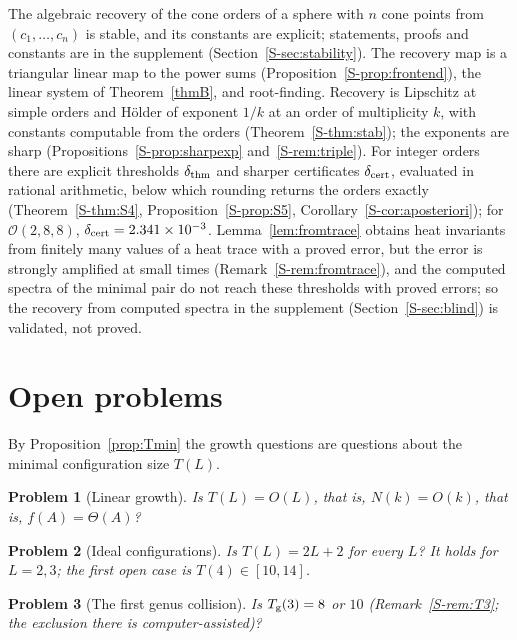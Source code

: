\documentclass[pdflatex,sn-mathphys-num]{sn-jnl}
\theoremstyle{thmstyleone}%
\theoremstyle{thmstylethree}%
\newtheorem{problem}{Problem}%
\newcommand{\Orb}{\mathcal{O}}
\newcommand{\sref}[1]{\ref*{S-#1}}%
\begin{document}
The algebraic recovery of the cone orders of a sphere with $n$ cone points from $(c_1,\dots,c_n)$ is stable, and its constants are explicit; statements, proofs and constants are in the supplement (Section~\sref{sec:stability}). The recovery map is a triangular linear map to the power sums (Proposition~\sref{prop:frontend}), the linear system of Theorem~\ref{thmB}, and root-finding. Recovery is Lipschitz at simple orders and H\"older of exponent $1/k$ at an order of multiplicity $k$, with constants computable from the orders (Theorem~\sref{thm:stab}); the exponents are sharp (Propositions~\sref{prop:sharpexp} and~\sref{rem:triple}). For integer orders there are explicit thresholds $\delta_{\rm thm}$ and sharper certificates $\delta_{\rm cert}$, evaluated in rational arithmetic, below which rounding returns the orders exactly (Theorem~\sref{thm:S4}, Proposition~\sref{prop:S5}, Corollary~\sref{cor:aposteriori}); for $\Orb(2,8,8)$, $\delta_{\rm cert}=2.341\times10^{-3}$. Lemma~\ref{lem:fromtrace} obtains heat invariants from finitely many values of a heat trace with a proved error, but the error is strongly amplified at small times (Remark~\sref{rem:fromtrace}), and the computed spectra of the minimal pair do not reach these thresholds with proved errors; so the recovery from computed spectra in the supplement (Section~\sref{sec:blind}) is validated, not proved.


\section{Open problems}\label{sec:open}

By Proposition~\ref{prop:Tmin} the growth questions are questions about the minimal configuration size $T(L)$.

\begin{problem}[Linear growth]\label{prob:growth}
Is $T(L)=O(L)$, that is, $N(k)=O(k)$, that is, $f(A)=\Theta(A)$?
\end{problem}

\begin{problem}[Ideal configurations]\label{prob:ideal}
Is $T(L)=2L+2$ for every $L$? It holds for $L=2,3$; the first open case is $T(4)\in[10,14]$.
\end{problem}

\begin{problem}[The first genus collision]\label{prob:T3}
Is $T_{\rm g}(3)=8$ or $10$ (Remark~\sref{rem:T3}; the exclusion there is computer-assisted)?
\end{problem}
\end{document}

